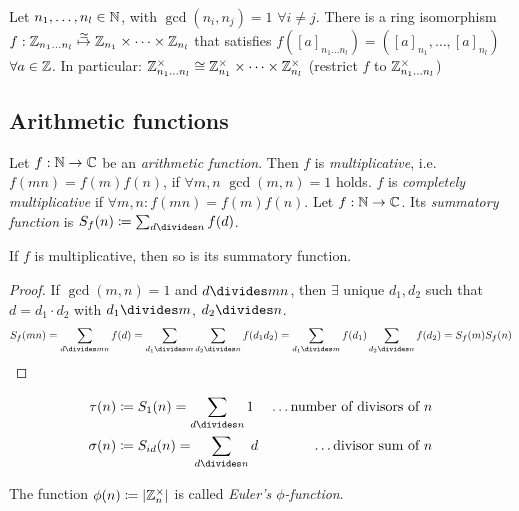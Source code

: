 \documentclass[NumTh.tex]{subfiles}
\begin{document}
\begin{ex}
  Let $n_1,\dots,n_l \in \mathbb{N}$, with $\gcd(n_i,n_j)= 1$ $\forall i \neq j$.
  There is a ring isomorphism $f: \mathbb{Z}_{n_1 \dots n_l} \overset{\simeq}{\mapsto} \mathbb{Z}_{n_1} \times \dots \times \mathbb{Z}_{n_l}$ that satisfies
  $f([a]_{n_1 \dots n_l}) = ([a]_{n_1},\dots,[a]_{n_l})$ $\forall a \in \mathbb{Z}$.
  In particular: $\mathbb{Z}_{n_1 \dots n_l}^\times \cong \mathbb{Z}_{n_1}^\times \times \dots \times \mathbb{Z}_{n_l}^\times$ (restrict $f$ to $\mathbb{Z}_{n_1 \dots n_l}^\times$)
\end{ex}


\subsection{Arithmetic functions}

\begin{defi}\label{def_0_4_1}
  Let $f: \mathbb{N} \to \mathbb{C}$ be an \emph{arithmetic function}.
  Then $f$ is \emph{multiplicative}, i.e. $f(mn) = f(m) f(n)$, if $\forall m,n $ $\gcd(m,n) = 1$ holds.
  $f$ is \emph{completely multiplicative} if $\forall m,n: f(mn) = f(m) f(n)$.
  Let $f: \mathbb{N} \to \mathbb{C}$. Its \emph{summatory function} is $S_{f}(n) \coloneq \sum_{d\divides n} f(d)$.
\end{defi}

\begin{lemma}\label{l_0_4_2}
  If $f$ is multiplicative, then so is its summatory function.
\end{lemma}

\begin{proof}
  If $\gcd(m,n) = 1$ and $d\divides mn$, then $\exists$ unique $d_1,d_2$ such that $d = d_1 \cdot d_2$ with $d_1 \divides  m$, $d_2\divides n$.
  \[S_f (mn) = \sum_{d\divides mn} f(d) = \sum_{d_1\divides m} \sum_{d_2\divides n} f(d_1 d_2) = \sum_{d_1\divides m} f(d_1) \sum_{d_2\divides n} f(d_2) = S_f(m) S_f(n)\]
\end{proof}

\begin{ex}
  \begin{align*}
    \tau(n) &\coloneq S_1(n) = \sum_{d\divides n} 1 &\text{\dots number of divisors of $n$} \\
    \sigma(n) &\coloneq S_{id}(n) = \sum_{d\divides n} d &\text{\dots divisor sum of $n$}
  \end{align*}
\end{ex}

\begin{defi}\label{def_0_4_3}
  The function $\phi(n) \coloneq \left\vert{\mathbb{Z}_n^\times}\right\vert$ is called \emph{Euler's $\phi$-function}.
\end{defi}
\end{document}
